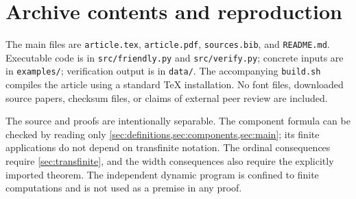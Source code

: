 \documentclass[11pt,letterpaper]{article}
\theoremstyle{definition}
\theoremstyle{remark}
\begin{document}
\section{Archive contents and reproduction}
The main files are \texttt{article.tex}, \texttt{article.pdf},
\texttt{sources.bib}, and \texttt{README.md}. Executable code is in
\texttt{src/friendly.py} and \texttt{src/verify.py}; concrete inputs are in
\texttt{examples/}; verification output is in \texttt{data/}. The accompanying
\texttt{build.sh} compiles the article using a standard TeX installation.
No font files, downloaded source papers, checksum files, or claims of external
peer review are included.

The source and proofs are intentionally separable. The component formula
can be checked by reading only \cref{sec:definitions,sec:components,sec:main};
its finite applications do not depend on transfinite notation. The ordinal
consequences require \cref{sec:transfinite}, and the width consequences also
require the explicitly imported theorem. The independent dynamic program
is confined to finite computations and is not used as a premise in any proof.



\end{document}
